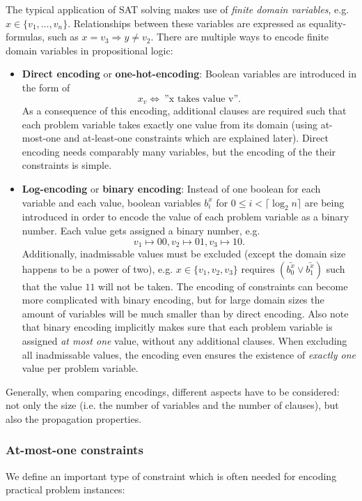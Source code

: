 \documentclass{article}
\theoremstyle{definition}
\begin{document}
	The typical application of SAT solving makes use of \emph{finite domain variables}, e.g. $x \in \{ v_1, \ldots , v_n \}$. Relationships between these variables are expressed as equality-formulas, such as $x = v_3 \Rightarrow y \neq v_2$. There are multiple ways to encode finite domain variables in propositional logic:
	\begin{itemize}
	\item \textbf{Direct encoding} or \textbf{one-hot-encoding}: Boolean variables are introduced in the form of \[x_v \Leftrightarrow\ \text{''x takes value v''}.\] As a consequence of this encoding, additional clauses are required such that each problem variable takes exactly one value from its domain (using at-most-one and at-least-one constraints which are explained later). Direct encoding needs comparably many variables, but the encoding of the their constraints is simple.
	\item \textbf{Log-encoding} or \textbf{binary encoding}: Instead of one boolean for each variable and each value, boolean variables $b_i^x$ for $0 \leq i < \lceil \log_2 n \rceil$ are being introduced in order to encode the value of each problem variable as a binary number. Each value gets assigned a binary number, e.g. \[v_1 \mapsto 00, v_2 \mapsto 01, v_3 \mapsto 10.\] Additionally, inadmissable values must be excluded (except the domain size happens to be a power of two), e.g. $x \in \{v_1, v_2, v_3\} \text{ requires } (\bar{b_0^x} \vee \bar{b_1^x})$ such that the value $11$ will not be taken. The encoding of constraints can become more complicated with binary encoding, but for large domain sizes the amount of variables will be much smaller than by direct encoding. Also note that binary encoding implicitly makes sure that each problem variable is assigned \emph{at most one} value, without any additional clauses. When excluding all inadmissable values, the encoding even ensures the existence of \emph{exactly one} value per problem variable.
	\end{itemize}
	Generally, when comparing encodings, different aspects have to be considered: not only the size (i.e. the number of variables and the number of clauses), but also the propagation properties.
	
\subsubsection{At-most-one constraints}	
	
We define an important type of constraint which is often needed for encoding practical problem instances:
\end{document}

